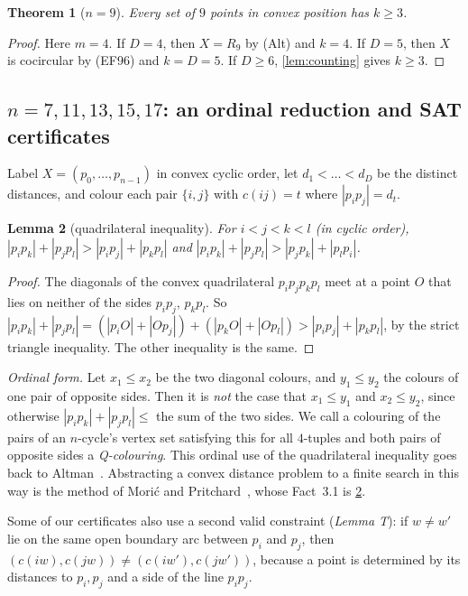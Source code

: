 \documentclass[11pt]{amsart}
\newtheorem{theorem}{Theorem}[section]
\newtheorem{lemma}[theorem]{Lemma}
\theoremstyle{definition}
\theoremstyle{remark}
\begin{document}
\begin{theorem}[$n=9$]\label{thm:nine}
Every set of $9$ points in convex position has $k\ge3$.
\end{theorem}
\begin{proof}
Here $m=4$. If $D=4$, then $X=R_9$ by (Alt) and $k=4$. If $D=5$, then $X$ is cocircular by (EF96) and $k=D=5$. If $D\ge6$, \cref{lem:counting} gives $k\ge3$.
\end{proof}

\subsection{\texorpdfstring{$n=7,11,13,15,17$}{n = 7, 11, 13, 15, 17}: an ordinal reduction and SAT certificates}\label{sec:sat}

Label $X=(p_0,\dots,p_{n-1})$ in convex cyclic order, let $d_1<\dots<d_D$ be the distinct distances, and colour each pair $\{i,j\}$ with $c(ij)=t$ where $|p_ip_j|=d_t$.

\begin{lemma}[quadrilateral inequality]\label{lem:Q}
For $i<j<k<l$ (in cyclic order), $|p_ip_k|+|p_jp_l|>|p_ip_j|+|p_kp_l|$ and $|p_ip_k|+|p_jp_l|>|p_jp_k|+|p_lp_i|$.
\end{lemma}
\begin{proof}
The diagonals of the convex quadrilateral $p_ip_jp_kp_l$ meet at a point $O$ that lies on neither of the sides $p_ip_j$, $p_kp_l$. So $|p_ip_k|+|p_jp_l|=(|p_iO|+|Op_j|)+(|p_kO|+|Op_l|)>|p_ip_j|+|p_kp_l|$, by the strict triangle inequality. The other inequality is the same.
\end{proof}

\emph{Ordinal form.} Let $x_1\le x_2$ be the two diagonal colours, and $y_1\le y_2$ the colours of one pair of opposite sides. Then it is \emph{not} the case that $x_1\le y_1$ and $x_2\le y_2$, since otherwise $|p_ip_k|+|p_jp_l|\le$ the sum of the two sides. We call a colouring of the pairs of an $n$-cycle's vertex set satisfying this for all $4$-tuples and both pairs of opposite sides a \emph{Q-colouring}. This ordinal use of the quadrilateral inequality goes back to Altman~\cite{Alt63}. Abstracting a convex distance problem to a finite search in this way is the method of Mori\'c and Pritchard~\cite{MP11}, whose Fact~3.1 is \cref{lem:Q}.

Some of our certificates also use a second valid constraint (\emph{Lemma T}): if $w\ne w'$ lie on the same open boundary arc between $p_i$ and $p_j$, then $(c(iw),c(jw))\ne(c(iw'),c(jw'))$, because a point is determined by its distances to $p_i,p_j$ and a side of the line $p_ip_j$.
\end{document}
